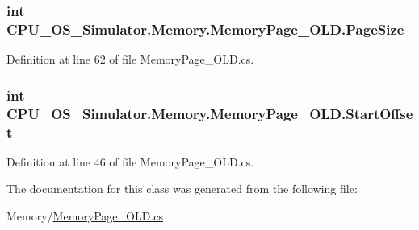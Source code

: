 \subsubsection[{Page\+Size}]{\setlength{\rightskip}{0pt plus 5cm}int C\+P\+U\+\_\+\+O\+S\+\_\+\+Simulator.\+Memory.\+Memory\+Page\+\_\+\+O\+L\+D.\+Page\+Size\hspace{0.3cm}{\ttfamily [get]}}\label{class_c_p_u___o_s___simulator_1_1_memory_1_1_memory_page___o_l_d_a058448789b0f5223ef410b223f2e9bb3}


Definition at line 62 of file Memory\+Page\+\_\+\+O\+L\+D.\+cs.

\hypertarget{class_c_p_u___o_s___simulator_1_1_memory_1_1_memory_page___o_l_d_aabc0df1123ef7c01b14a5b3a23615760}{}
\subsubsection[{Start\+Offset}]{\setlength{\rightskip}{0pt plus 5cm}int C\+P\+U\+\_\+\+O\+S\+\_\+\+Simulator.\+Memory.\+Memory\+Page\+\_\+\+O\+L\+D.\+Start\+Offset\hspace{0.3cm}{\ttfamily [get]}}\label{class_c_p_u___o_s___simulator_1_1_memory_1_1_memory_page___o_l_d_aabc0df1123ef7c01b14a5b3a23615760}


Definition at line 46 of file Memory\+Page\+\_\+\+O\+L\+D.\+cs.



The documentation for this class was generated from the following file\+:\begin{DoxyCompactItemize}
\item 
Memory/\hyperlink{_memory_page___o_l_d_8cs}{Memory\+Page\+\_\+\+O\+L\+D.\+cs}\end{DoxyCompactItemize}
